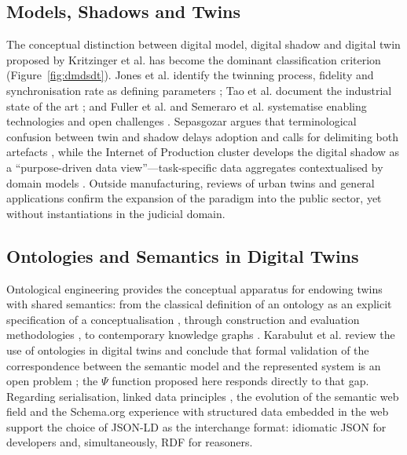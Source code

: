 \documentclass[engproc,article,submit,moreauthors]{Definitions/mdpi}
\begin{document}
\subsection{Models, Shadows and Twins}
The conceptual distinction between digital model, digital shadow and digital twin proposed by Kritzinger et al. \cite{Kritzinger2018} has become the dominant classification criterion (Figure~\ref{fig:dmdsdt}). Jones et al. identify the twinning process, fidelity and synchronisation rate as defining parameters \cite{Jones2020}; Tao et al. document the industrial state of the art \cite{Tao2019}; and Fuller et al. and Semeraro et al. systematise enabling technologies and open challenges \cite{Fuller2020,Semeraro2021}. Sepasgozar argues that terminological confusion between twin and shadow delays adoption and calls for delimiting both artefacts \cite{Sepasgozar2021}, while the Internet of Production cluster develops the digital shadow as a ``purpose-driven data view''---task-specific data aggregates contextualised by domain models \cite{Brauner2022}. Outside manufacturing, reviews of urban twins \cite{Shahat2021} and general applications \cite{BotinSanabria2022} confirm the expansion of the paradigm into the public sector, yet without instantiations in the judicial domain.

\subsection{Ontologies and Semantics in Digital Twins}
Ontological engineering provides the conceptual apparatus for endowing twins with shared semantics: from the classical definition of an ontology as an explicit specification of a conceptualisation \cite{Gruber1993}, through construction and evaluation methodologies \cite{Uschold1996,Guarino2002}, to contemporary knowledge graphs \cite{Hogan2021}. Karabulut et al. review the use of ontologies in digital twins and conclude that formal validation of the correspondence between the semantic model and the represented system is an open problem \cite{Karabulut2024}; the $\Psi$ function proposed here responds directly to that gap. Regarding serialisation, linked data principles \cite{Bizer2009}, the evolution of the semantic web field \cite{Hitzler2021} and the Schema.org experience with structured data embedded in the web \cite{Guha2016} support the choice of JSON-LD as the interchange format: idiomatic JSON for developers and, simultaneously, RDF for reasoners.
\end{document}

